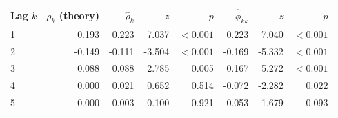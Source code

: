 \begin{tabular}{lrrrrrrr}
\toprule
Lag $k$ & $\rho_k$ (theory) & $\hat\rho_k$ & $z$ & $p$ & $\hat\phi_{kk}$ & $z$  & $p$  \\
\midrule
1 & 0.193 & 0.223 & 7.037 & $<0.001$ & 0.223 & 7.040 & $<0.001$ \\
2 & -0.149 & -0.111 & -3.504 & $<0.001$ & -0.169 & -5.332 & $<0.001$ \\
3 & 0.088 & 0.088 & 2.785 & 0.005 & 0.167 & 5.272 & $<0.001$ \\
4 & 0.000 & 0.021 & 0.652 & 0.514 & -0.072 & -2.282 & 0.022 \\
5 & 0.000 & -0.003 & -0.100 & 0.921 & 0.053 & 1.679 & 0.093 \\
\bottomrule
\end{tabular}
